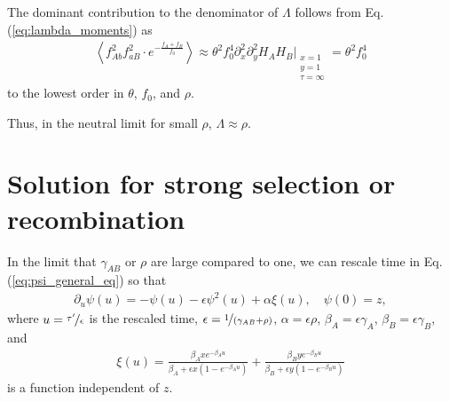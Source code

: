 \documentclass[aps,rmp,twocolumn,groupedaddress,floatfix,notitlepage]{revtex4-1}
\begin{document}
The dominant contribution to the denominator of $\Lambda$ follows from Eq. (\ref{eq:lambda_moments}) as 
\begin{align}\label{eq:lambda_denom_neutral}
    \left\langle f_{Ab}^2f_{aB}^2\cdot e^{-\frac{f_{A}+f_{B}}{f_0}}\right\rangle \approx \theta^2 f_0^4 \partial_x^2 \partial_y^2 H_A H_B \Bigg\vert_{\substack{x=1 \\ y=1 \\ \tau=\infty}} 
    = \theta^2 f_0^4
\end{align}
to the lowest order in $\theta$, $f_0$, and $\rho$.

Thus, in the neutral limit for small $\rho$, $\Lambda \approx \rho$.


\section{Solution for strong selection or recombination}
\label{appendix:strong-selection-recombination}

In the limit that $\gamma_{AB}$ or $\rho$ are large compared to one, we can rescale time in Eq. (\ref{eq:psi_general_eq}) so that
\begin{align}\label{eq:z_strong_s}
    \partial_{u} \psi(u) = -\psi(u) - \epsilon \psi^2(u) + \alpha \xi(u), \quad \psi(0) = z,
\end{align}
where $u= \nicefrac{\tau'}{\epsilon}$ is the rescaled time, $\epsilon = \nicefrac{1}{(\gamma_{AB}+\rho)}$, $\alpha = \epsilon \rho$, $\beta_A = \epsilon \gamma_A$, $\beta_B = \epsilon \gamma_B$, and 
\begin{align}
    \xi(u) = \frac{\beta_Axe^{-\beta_A u}}{\beta_A + \epsilon x(1-e^{-\beta_A u})} + \frac{\beta_B ye^{-\beta_B u}}{\beta_B + \epsilon y(1-e^{-\beta_B u})}
\end{align}
is a function independent of $z$.
\end{document}
